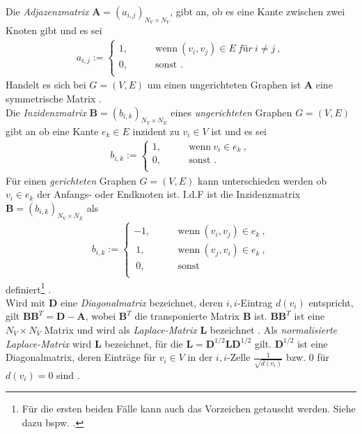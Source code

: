 \documentclass[12pt, a4paper]{report}
\begin{document}
Die \textit{Adjazenzmatrix} $\textbf{A}=(a_{i,j})_{N_V \times N_V}$, gibt an, ob es eine Kante zwischen zwei Knoten gibt und es sei 
\begin{align}
a_{i,j} := \begin{cases}
1, \qquad &\text{wenn} \ (v_i,v_j) \in E \ \textit{für} \ i \neq j \ ,\\
0, \qquad &\text{sonst \ .}\\
\end{cases}
\end{align}
Handelt es sich bei $G=(V,E)$ um einen ungerichteten Graphen ist $\textbf{A}$ eine symmetrische Matrix \cite{kolaczyk2009statistical}.\\
Die \textit{Inzidenzmatrix} $\textbf{\~B}=(b_{i,k})_{N_V \times N_E}$ eines \textit{ungerichteten} Graphen $G=(V,E)$ gibt an ob eine Kante $e_k \in E$ inzident zu $v_i \in V$ ist \cite{kolaczyk2009statistical} und es sei
\begin{align}
b_{i,k} := \begin{cases}
1, \qquad &\text{wenn} \ v_i \in e_k \ ,\\
0, \qquad &\text{sonst .}\\
\end{cases}
\end{align}
Für einen \textit{gerichteten} Graphen $G=(V,E)$ kann unterschieden werden ob $v_i \in e_k$ der Anfangs- oder Endknoten ist. \mbox{I.d.F} ist die Inzidenzmatrix $\textbf{B}=(b_{i,k})_{N_V \times N_E}$ als
\begin{align}
b_{i,k} := \begin{cases}
-1, \qquad &\text{wenn} \ (v_i,v_j) \in e_k \ ,\\
\ 1, \qquad &\text{wenn} \ (v_j,v_i) \in e_k \ ,\\
\ 0, \qquad &\text{sonst}\\
\end{cases}
\end{align}
definiert\footnote{Für die ersten beiden Fälle kann auch das Vorzeichen getauscht werden. Siehe dazu bspw. .} \cite{brandes2005graphfunda}.\\
Wird mit $\textbf{D}$ eine \textit{Diagonalmatrix} bezeichnet, deren $i,i$-Eintrag $d(v_i)$ entspricht, gilt $\textbf{BB}^T=\textbf{D}-\textbf{A}$, wobei $\textbf{B}^T$ die transponierte Matrix $\textbf{B}$ ist. $\textbf{BB}^T$ ist eine $N_V \times N_V$ Matrix und wird als \textit{Laplace-Matrix} $\textbf{L}$ bezeichnet \cite{kolaczyk2009statistical}. Als \textit{normalisierte Laplace-Matrix} wird $\textbf{\~L}$ bezeichnet, für die $\textbf{\~L}=\textbf{D}^{1/2}\textbf{L}\textbf{D}^{1/2}$ gilt. $\textbf{D}^{1/2}$ ist eine Diagonalmatrix, deren Einträge für $v_i \in V$ in der $i,i$-Zelle $\frac{1}{\sqrt{d(v_i)}}$ bzw. $0$ für $d(v_i)=0$ sind \cite{brandes2005graphfunda}.\\
\end{document}
